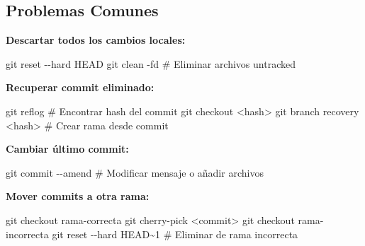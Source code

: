 \documentclass[
  doc,
  floatsintext,
  longtable,
  a4paper,
  nolmodern,
  notxfonts,
  notimes,
  12pt,
  colorlinks=true,linkcolor=blue,citecolor=blue,urlcolor=blue]{apa7}
\newenvironment{Shaded}{\begin{snugshade}}{\end{snugshade}}
\newcommand{\AttributeTok}[1]{\textcolor[rgb]{0.40,0.45,0.13}{#1}}
\newcommand{\CommentTok}[1]{\textcolor[rgb]{0.37,0.37,0.37}{#1}}
\newcommand{\FunctionTok}[1]{\textcolor[rgb]{0.28,0.35,0.67}{#1}}
\newcommand{\NormalTok}[1]{\textcolor[rgb]{0.00,0.23,0.31}{#1}}
\newcommand{\OperatorTok}[1]{\textcolor[rgb]{0.37,0.37,0.37}{#1}}
\begin{document}
\subsection{Problemas Comunes}\label{problemas-comunes}

\textbf{Descartar todos los cambios locales:}

\begin{Shaded}
\begin{Highlighting}[]
\FunctionTok{git}\NormalTok{ reset }\AttributeTok{{-}{-}hard}\NormalTok{ HEAD}
\FunctionTok{git}\NormalTok{ clean }\AttributeTok{{-}fd}  \CommentTok{\# Eliminar archivos untracked}
\end{Highlighting}
\end{Shaded}

\textbf{Recuperar commit eliminado:}

\begin{Shaded}
\begin{Highlighting}[]
\FunctionTok{git}\NormalTok{ reflog  }\CommentTok{\# Encontrar hash del commit}
\FunctionTok{git}\NormalTok{ checkout }\OperatorTok{\textless{}}\NormalTok{hash}\OperatorTok{\textgreater{}}
\FunctionTok{git}\NormalTok{ branch recovery }\OperatorTok{\textless{}}\NormalTok{hash}\OperatorTok{\textgreater{}}  \CommentTok{\# Crear rama desde commit}
\end{Highlighting}
\end{Shaded}

\textbf{Cambiar último commit:}

\begin{Shaded}
\begin{Highlighting}[]
\FunctionTok{git}\NormalTok{ commit }\AttributeTok{{-}{-}amend}  \CommentTok{\# Modificar mensaje o añadir archivos}
\end{Highlighting}
\end{Shaded}

\textbf{Mover commits a otra rama:}

\begin{Shaded}
\begin{Highlighting}[]
\FunctionTok{git}\NormalTok{ checkout rama{-}correcta}
\FunctionTok{git}\NormalTok{ cherry{-}pick }\OperatorTok{\textless{}}\NormalTok{commit}\OperatorTok{\textgreater{}}
\FunctionTok{git}\NormalTok{ checkout rama{-}incorrecta}
\FunctionTok{git}\NormalTok{ reset }\AttributeTok{{-}{-}hard}\NormalTok{ HEAD\textasciitilde{}1  }\CommentTok{\# Eliminar de rama incorrecta}
\end{Highlighting}
\end{Shaded}
\end{document}

